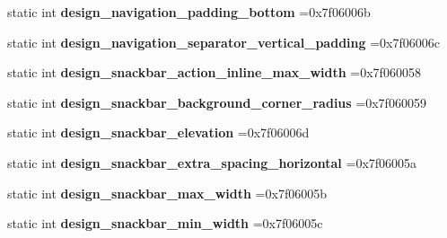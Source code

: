 \begin{DoxyCompactItemize}
static int {\bfseries design\+\_\+navigation\+\_\+padding\+\_\+bottom} =0x7f06006b
\item 
\mbox{\label{classandroid_1_1support_1_1v7_1_1appcompat_1_1R_1_1dimen_a4efecd8357b52086dbfa68326d6165e3}} 
static int {\bfseries design\+\_\+navigation\+\_\+separator\+\_\+vertical\+\_\+padding} =0x7f06006c
\item 
\mbox{\label{classandroid_1_1support_1_1v7_1_1appcompat_1_1R_1_1dimen_aaa250717f49d61f8af1908f1203d6919}} 
static int {\bfseries design\+\_\+snackbar\+\_\+action\+\_\+inline\+\_\+max\+\_\+width} =0x7f060058
\item 
\mbox{\label{classandroid_1_1support_1_1v7_1_1appcompat_1_1R_1_1dimen_a8dd283310180cd6c3f1f7caf69175135}} 
static int {\bfseries design\+\_\+snackbar\+\_\+background\+\_\+corner\+\_\+radius} =0x7f060059
\item 
\mbox{\label{classandroid_1_1support_1_1v7_1_1appcompat_1_1R_1_1dimen_a6c86d3c256d9cd52b3d9a41afcc2a1d3}} 
static int {\bfseries design\+\_\+snackbar\+\_\+elevation} =0x7f06006d
\item 
\mbox{\label{classandroid_1_1support_1_1v7_1_1appcompat_1_1R_1_1dimen_ab6c7cedc5a04bc18d248ca08876909bf}} 
static int {\bfseries design\+\_\+snackbar\+\_\+extra\+\_\+spacing\+\_\+horizontal} =0x7f06005a
\item 
\mbox{\label{classandroid_1_1support_1_1v7_1_1appcompat_1_1R_1_1dimen_a79d2a8bad6d5859367de1c8f27a19197}} 
static int {\bfseries design\+\_\+snackbar\+\_\+max\+\_\+width} =0x7f06005b
\item 
\mbox{\label{classandroid_1_1support_1_1v7_1_1appcompat_1_1R_1_1dimen_a261511e7931f714ea40f721c0c213506}} 
static int {\bfseries design\+\_\+snackbar\+\_\+min\+\_\+width} =0x7f06005c
\item 
\mbox{\label{classandroid_1_1support_1_1v7_1_1appcompat_1_1R_1_1dimen_a86ecb7ee05c71cd53cd58f8d611e193b}} 

\end{DoxyCompactItemize}
